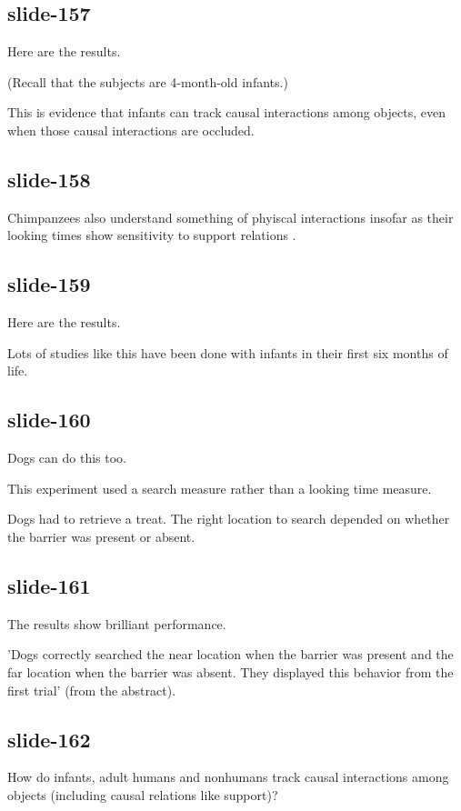 \documentclass[12pt,\papersize]{extarticle}
\begin{document}
\subsection{slide-157}
Here are the results.
 
(Recall that the subjects are 4-month-old infants.)
 
This is evidence that infants can track causal interactions among objects, even when those causal interactions are occluded.
 
\subsection{slide-158}
Chimpanzees also understand something of phyiscal interactions insofar as their looking times show sensitivity to support relations \citep{cacchione:2004_recognizing}.
 
\subsection{slide-159}
Here are the results.
 
Lots of studies like this have been done with infants in their first six months of life.
 
\subsection{slide-160}
Dogs can do this too.
 
This experiment used a search measure rather than a looking time measure.
 
Dogs had to retrieve a treat.  The right location to search depended on whether the barrier was present or absent.
 
\subsection{slide-161}
The results show brilliant performance.
 
'Dogs correctly searched the near location when the barrier was present and the far location when the barrier was absent. They displayed this behavior from the first trial' \citep{kundey:2010_domesticated} (from the abstract).
 
\subsection{slide-162}
How do infants, adult humans and nonhumans track causal interactions among objects (including causal relations like support)?
 
\end{document}

